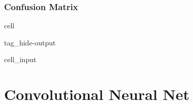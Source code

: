 \documentclass[letterpaper,10pt,english]{jupyterBook}
\begin{document}
\section{Confusion Matrix}
\label{\detokenize{02_NN/NeuralNet_2 (Mehrere Ausgaenge):confusion-matrix}}
\begin{sphinxuseclass}{cell}
\begin{sphinxuseclass}{tag_hide-output}\begin{sphinxVerbatimInput}

\begin{sphinxuseclass}{cell_input}
\begin{sphinxVerbatim}[commandchars=\\\{\}]
   
       
       
 
\end{sphinxVerbatim}

\end{sphinxuseclass}\end{sphinxVerbatimInput}

\end{sphinxuseclass}
\end{sphinxuseclass}

\part{Convolutional Neural Net}
\end{document}
